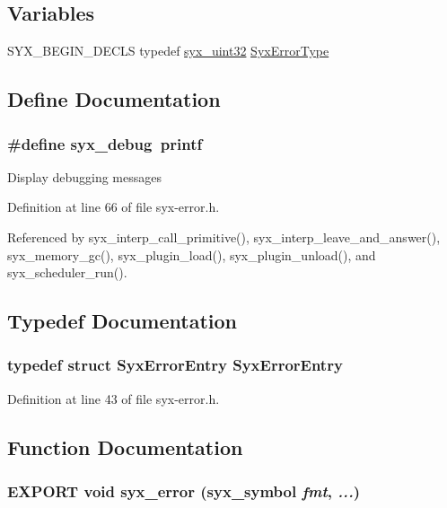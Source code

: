 \subsection*{Variables}
\begin{CompactItemize}
\item 
SYX\_\-BEGIN\_\-DECLS typedef \hyperlink{syx-types_8h_eb2d8221bf07737360750e4c0ec66a99}{syx\_\-uint32} \hyperlink{syx-error_8h_514c3f7a5b2ca79dc0d2ba5e1464a36e}{SyxErrorType}
\end{CompactItemize}


\subsection{Define Documentation}
\hypertarget{syx-error_8h_b1279ef115dd518ef5b63b51ae495fa5}{
\subsubsection{\setlength{\rightskip}{0pt plus 5cm}\#define syx\_\-debug~printf}}
\label{syx-error_8h_b1279ef115dd518ef5b63b51ae495fa5}


Display debugging messages 

Definition at line 66 of file syx-error.h.

Referenced by syx\_\-interp\_\-call\_\-primitive(), syx\_\-interp\_\-leave\_\-and\_\-answer(), syx\_\-memory\_\-gc(), syx\_\-plugin\_\-load(), syx\_\-plugin\_\-unload(), and syx\_\-scheduler\_\-run().

\subsection{Typedef Documentation}
\hypertarget{syx-error_8h_e71af3dc427617903fb6a6542c2fcc54}{
\subsubsection{\setlength{\rightskip}{0pt plus 5cm}typedef struct {\bf SyxErrorEntry} {\bf SyxErrorEntry}}}
\label{syx-error_8h_e71af3dc427617903fb6a6542c2fcc54}




Definition at line 43 of file syx-error.h.

\subsection{Function Documentation}
\hypertarget{syx-error_8h_32ccf51e335c35ba5c51d75a62590e63}{
\subsubsection{\setlength{\rightskip}{0pt plus 5cm}EXPORT void syx\_\-error ({\bf syx\_\-symbol} {\em fmt}, \/   {\em ...})}}
\label{syx-error_8h_32ccf51e335c35ba5c51d75a62590e63}


